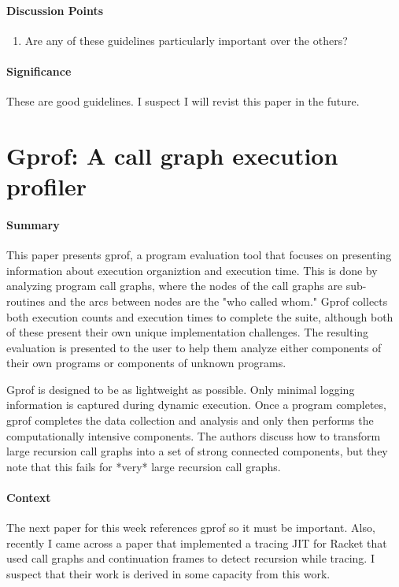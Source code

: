 \paragraph{\textbf{Discussion Points}}
\begin{enumerate}
    \item Are any of these guidelines particularly important over the others?
\end{enumerate}

\paragraph{\textbf{Significance}}
These are good guidelines. I suspect I will revist this paper in the future.

\section {Gprof: A call graph execution profiler \cite{graham1982gprof}}

\paragraph{\textbf{Summary}}
This paper presents gprof, a program evaluation tool that focuses on presenting
information about execution organiztion and execution time. This is done by
analyzing program call graphs, where the nodes of the call graphs are
sub-routines and the arcs between nodes are the "who called whom." Gprof
collects both execution counts and execution times to complete the suite,
although both of these present their own unique implementation challenges. The
resulting evaluation is presented to the user to help them analyze either
components of their own programs or components of unknown programs.

Gprof is designed to be as lightweight as possible. Only minimal logging
information is captured during dynamic execution. Once a program completes,
gprof completes the data collection and analysis and only then performs the
computationally intensive components. The authors discuss how to transform
large recursion call graphs into a set of strong connected components, but they
note that this fails for *very* large recursion call graphs.

\paragraph{\textbf{Context}}
The next paper for this week references gprof so it must be important. Also,
recently I came across a paper that implemented a tracing JIT for Racket that
used call graphs and continuation frames to detect recursion while tracing. I
suspect that their work is derived in some capacity from this work.

